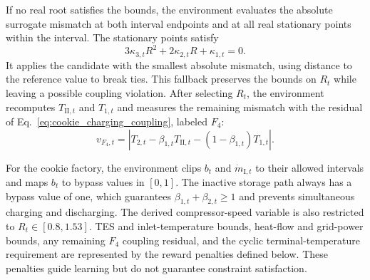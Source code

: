 \documentclass[12pt]{article}
\begin{document}
If no real root satisfies the bounds, the environment evaluates the absolute
surrogate mismatch at both interval endpoints and at all real stationary
points within the interval. The stationary points satisfy
\[
3\kappa_{3,t}R^2+2\kappa_{2,t}R+\kappa_{1,t}=0.
\]
It applies the candidate with the smallest absolute mismatch, using distance
to the reference value to break ties. This fallback preserves the bounds on
$R_t$ while leaving a possible coupling violation. After selecting $R_t$,
the environment recomputes $T_{\mathrm{II},t}$ and $T_{1,t}$ and measures
the remaining mismatch with the residual of
Eq.~\eqref{eq:cookie_charging_coupling}, labeled $F_4$:
\[
v_{F_4,t}=\left|
T_{2,t}-\beta_{1,t}T_{\mathrm{II},t}
-(1-\beta_{1,t})T_{1,t}
\right|.
\]

For the cookie factory, the environment clips $b_t$ and $\dot m_{\mathrm I,t}$ to their allowed intervals and maps $b_t$ to bypass values in $[0,1]$. The inactive storage path always has a bypass value of one, which guarantees $\beta_{1,t}+\beta_{2,t}\geq1$ and prevents simultaneous charging and discharging. The derived compressor-speed variable is also restricted to $R_t\in[0.8,1.53]$. TES and inlet-temperature bounds, heat-flow and grid-power bounds, any remaining $F_4$ coupling residual, and the cyclic terminal-temperature requirement are represented by the reward penalties defined below. These penalties guide learning but do not guarantee constraint satisfaction.
\end{document}

